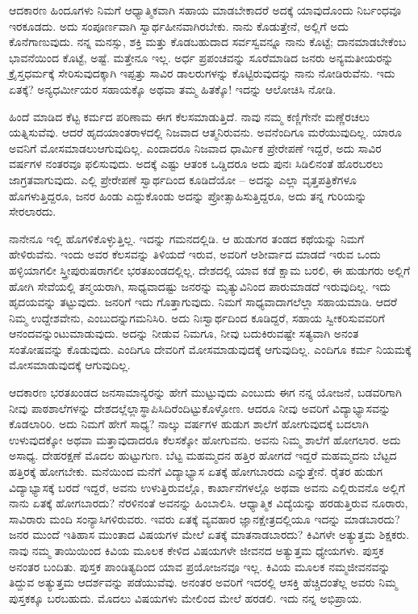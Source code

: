 ಆದಕಾರಣ ಹಿಂದೂಗಳು ನಿಮಗೆ ಆಧ್ಯಾತ್ಮಿಕವಾಗಿ ಸಹಾಯ ಮಾಡಬೇಕಾದರೆ ಅದಕ್ಕೆ ಯಾವುದೊಂದು ನಿರ್ಬಂಧವೂ ಇರಕೂಡದು. ಅದು ಸಂಪೂರ್ಣವಾಗಿ ಸ್ವಾರ್ಥಹೀನವಾಗಿರಬೇಕು. ನಾನು ಕೊಡುತ್ತೇನೆ, ಅಲ್ಲಿಗೆ ಅದು ಕೊನೆಗಾಣುವುದು. ನನ್ನ ಮನಸ್ಸು, ಶಕ್ತಿ ಮತ್ತು ಕೊಡಬಹುದಾದ ಸರ್ವಸ್ವವನ್ನೂ ನಾನು ಕೊಟ್ಟೆ; ದಾನಮಾಡಬೇಕೆಂಬ ಭಾವನೆಯಿಂದ ಕೊಟ್ಟೆ, ಅಷ್ಟೆ. ಮತ್ತೇನೂ ಇಲ್ಲ. ಅರ್ಧ ಪ್ರಪಂಚವನ್ನು ಸೂರೆಮಾಡಿದ ಜನರು ಅನ್ಯಮತೀಯರನ್ನು ಕ್ರೈಸ್ತಧರ್ಮಕ್ಕೆ ಸೇರಿಸುವುದಕ್ಕಾಗಿ ಇಪ್ಪತ್ತು ಸಾವಿರ ಡಾಲರುಗಳನ್ನು ಕೊಟ್ಟಿರುವುದನ್ನು ನಾನು ನೋಡಿರುವೆನು. ಇದು ಏತಕ್ಕೆ? ಅನ್ಯಧರ್ಮೀಯರ ಸಹಾಯಕ್ಕೊ ಅಥವಾ ತಮ್ಮ ಹಿತಕ್ಕೊ! ಇದನ್ನು ಆಲೋಚಿಸಿ ನೋಡಿ.

ಹಿಂದೆ ಮಾಡಿದ ಕೆಟ್ಟ ಕರ್ಮದ ಪರಿಣಾಮ ಈಗ ಕೆಲಸಮಾಡುತ್ತಿದೆ. ನಾವು ನಮ್ಮ ಕಣ್ಣಿಗೇನೇ ಮಣ್ಣೆರಚಲು ಯತ್ನಿಸುವೆವು. ಆದರೆ ಹೃದಯಾಂತರಾಳದಲ್ಲಿ ನಿಜವಾದ ಆತ್ಮನಿರುವನು. ಅವನೆಂದಿಗೂ ಮರೆಯುವುದಿಲ್ಲ. ಯಾರೂ ಅವನಿಗೆ ಮೋಸಮಾಡಲು\break ಆಗುವುದಿಲ್ಲ. ಎಂದಾದರೂ ನಿಜವಾದ ಧಾರ್ಮಿಕ ಪ್ರೇರೇಪಣೆ ಇದ್ದರೆ, ಅದು ಸಾವಿರ ವರ್ಷಗಳ ನಂತರವೂ ಫಲಿಸುವುದು. ಅದಕ್ಕೆ ಎಷ್ಟು ಆತಂಕ ಒಡ್ಡಿದರೂ ಅದು ಪುನಃ ಸಿಡಿಲಿನಂತೆ ಹೊರಬರಲು ಜಾಗ್ರತವಾಗುವುದು. ಎಲ್ಲಿ ಪ್ರೇರೇಪಣೆ ಸ್ವಾರ್ಥದಿಂದ ಕೂಡಿದೆಯೋ – ಅದನ್ನು ಎಲ್ಲಾ ವೃತ್ತಪತ್ರಿಕೆಗಳೂ ಹೊಗಳುತ್ತಿದ್ದರೂ, ಜನರ ಹಿಂಡು ಎದ್ದುಕೊಂಡು ಅದನ್ನು ಪ್ರೋತ್ಸಾಹಿಸುತ್ತಿದ್ದರೂ, ಅದು ತನ್ನ ಗುರಿಯನ್ನು ಸೇರಲಾರದು.

ನಾನೇನೂ ಇಲ್ಲಿ ಹೊಗಳಿಕೊಳ್ಳುತ್ತಿಲ್ಲ. ಇದನ್ನು ಗಮನದಲ್ಲಿಡಿ. ಆ ಹುಡುಗರ ತಂಡದ ಕಥೆಯನ್ನು ನಿಮಗೆ ಹೇಳಿರುವೆನು. ಇಂದು ಅವರ ಕೆಲಸವನ್ನು ತಿಳಿಯದೆ ಇರುವ, ಅವರಿಗೆ ಆಶೀರ್ವಾದ ಮಾಡದೆ ಇರುವ ಒಂದು ಹಳ್ಳಿಯಾಗಲೀ ಸ್ತ್ರೀಪುರುಷರಾಗಲೀ ಭರತಖಂಡದಲ್ಲಿಲ್ಲ. ದೇಶದಲ್ಲಿ ಯಾವ ಕಡೆ ಕ್ಷಾಮ ಬರಲಿ, ಈ ಹುಡುಗರು ಅಲ್ಲಿಗೆ ಹೋಗಿ ಸೇವೆಯಲ್ಲಿ ತನ್ಮಯರಾಗಿ, ಸಾಧ್ಯವಾದಷ್ಟು ಜನರನ್ನು ಮೃತ್ಯುವಿನಿಂದ ಪಾರುಮಾಡದೆ ಇರುವುದಿಲ್ಲ. ಇದು ಹೃದಯವನ್ನು ತಟ್ಟುವುದು. ಜನರಿಗೆ ಇದು ಗೊತ್ತಾಗುವುದು. ನಿಮಗೆ ಸಾಧ್ಯವಾದಾಗಲೆಲ್ಲಾ ಸಹಾಯಮಾಡಿ. ಆದರೆ ನಿಮ್ಮ ಉದ್ದೇಶವೇನು, ಎಂಬುದನ್ನು\break ಗಮನಿಸಿರಿ. ಅದು ನಿಃಸ್ವಾರ್ಥದಿಂದ ಕೂಡಿದ್ದರೆ, ಸಹಾಯ ಸ್ವೀಕರಿಸುವವರಿಗೆ ಆನಂದವನ್ನುಂಟುಮಾಡುವುದು. ಅದನ್ನು ನೀಡುವ ನಿಮಗೂ, ನೀವು ಬದುಕಿರುವಷ್ಟೇ ಸತ್ಯವಾಗಿ ಅನಂತ ಸಂತೋಷವನ್ನು ಕೊಡುವುದು. ಎಂದಿಗೂ ದೇವರಿಗೆ ಮೋಸಮಾಡುವುದಕ್ಕೆ ಆಗುವುದಿಲ್ಲ. ಎಂದಿಗೂ ಕರ್ಮ ನಿಯಮಕ್ಕೆ ಮೋಸಮಾಡುವುದಕ್ಕೆ ಆಗುವುದಿಲ್ಲ.

ಆದಕಾರಣ ಭರತಖಂಡದ ಜನಸಾಮಾನ್ಯರನ್ನು ಹೇಗೆ ಮುಟ್ಟುವುದು ಎಂಬುದು ಈಗ ನನ್ನ ಯೋಜನೆ, ಬಡವರಿಗಾಗಿ ನೀವು ಪಾಠಶಾಲೆಗಳನ್ನು ದೇಶದಲ್ಲೆಲ್ಲಾ\break ಸ್ಥಾಪಿಸಿದಿರೆಂದಿಟ್ಟುಕೊಳ್ಳೋಣ. ಆದರೂ ನೀವು ಅವರಿಗೆ ವಿದ್ಯಾಭ್ಯಾಸವನ್ನು ಕೊಡಲಾರಿರಿ. ಅದು ನಿಮಗೆ ಹೇಗೆ ಸಾಧ್ಯ? ನಾಲ್ಕು ವರ್ಷಗಳ ಹುಡುಗ ಶಾಲೆಗೆ ಹೋಗುವುದಕ್ಕೆ ಬದಲಾಗಿ ಉಳುವುದಕ್ಕೋ ಅಥವಾ ಮತ್ತಾವುದಾದರೂ ಕೆಲಸಕ್ಕೋ ಹೋಗುವನು. ಅವನು ನಿಮ್ಮ ಶಾಲೆಗೆ ಹೋಗಲಾರ. ಅದು ಅಸಾಧ್ಯ. ದೇಹರಕ್ಷಣೆ ಮೊದಲ ಹುಟ್ಟುಗುಣ. ಬೆಟ್ಟ ಮಹಮ್ಮದನ ಹತ್ತಿರ ಹೋಗದೆ ಇದ್ದರೆ ಮಹಮ್ಮದನು ಬೆಟ್ಟದ ಹತ್ತಿರಕ್ಕೆ ಹೋಗಬೇಕು. ಮನೆಯಿಂದ ಮನೆಗೆ ವಿದ್ಯಾಭ್ಯಾಸ ಏತಕ್ಕೆ ಹೋಗಬಾರದು ಎನ್ನುತ್ತೇನೆ. ರೈತರ ಹುಡುಗ ವಿದ್ಯಾಭ್ಯಾಸಕ್ಕೆ ಬರದೆ ಇದ್ದರೆ, ಅವನು ಉಳುತ್ತಿರುವಲ್ಲೊ, ಕಾರ್ಖಾನೆಗಳಲ್ಲೊ ಅಥವಾ ಅವನು ಎಲ್ಲಿರುವನೊ ಅಲ್ಲಿಗೆ ನಾನು ಏತಕ್ಕೆ ಹೋಗಬಾರದು? ನೆರಳಿನಂತೆ ಅವನನ್ನು ಹಿಂಬಾಲಿಸಿ. ಆಧ್ಯಾತ್ಮಿಕ ವಿದ್ಯೆಯನ್ನು ಹರಡುತ್ತಿರುವ ನೂರಾರು, ಸಾವಿರಾರು ಮಂದಿ ಸಂನ್ಯಾಸಿಗಳಿರುವರು. ಇವರು ಏತಕ್ಕೆ ವ್ಯವಹಾರ ಜ್ಞಾನಕ್ಷೇತ್ರದಲ್ಲಿಯೂ ಇದನ್ನು ಮಾಡಬಾರದು? ಜನರ ಮುಂದೆ ಇತಿಹಾಸ ಮುಂತಾದ ವಿಷಯಗಳ ಮೇಲೆ ಏತಕ್ಕೆ ಮಾತನಾಡಬಾರದು? ಕಿವಿಗಳೇ ಅತ್ಯುತ್ತಮ ಶಿಕ್ಷಕರು. ನಾವು ನಮ್ಮ ತಾಯಿಯಿಂದ ಕಿವಿಯ ಮೂಲಕ ಕೇಳಿದ ವಿಷಯಗಳೇ ಜೀವನದ ಅತ್ಯುತ್ತಮ ಧ್ಯೇಯಗಳು. ಪುಸ್ತಕ ಅನಂತರ ಬಂದಿತು. ಪುಸ್ತಕ ಪಾಂಡಿತ್ಯದಿಂದ ಯಾವ ಪ್ರಯೋಜನವೂ ಇಲ್ಲ. ಕಿವಿಯ ಮೂಲಕ ನಮ್ಮ\break ಜೀವನವನ್ನು ತಿದ್ದುವ ಅತ್ಯುತ್ತಮ ಆದರ್ಶವನ್ನು ಪಡೆಯುವೆವು. ಅನಂತರ ಅವರಿಗೆ ಇದರಲ್ಲಿ ಆಸಕ್ತಿ ಹೆಚ್ಚಿದಂತೆಲ್ಲ ಅವರು ನಿಮ್ಮ ಪುಸ್ತಕಕ್ಕೂ ಬರಬಹುದು. ಮೊದಲು ವಿಷಯಗಳು ಮೇಲಿಂದ ಮೇಲೆ ಹರಡಲಿ. ಇದು ನನ್ನ ಅಭಿಪ್ರಾಯ.

